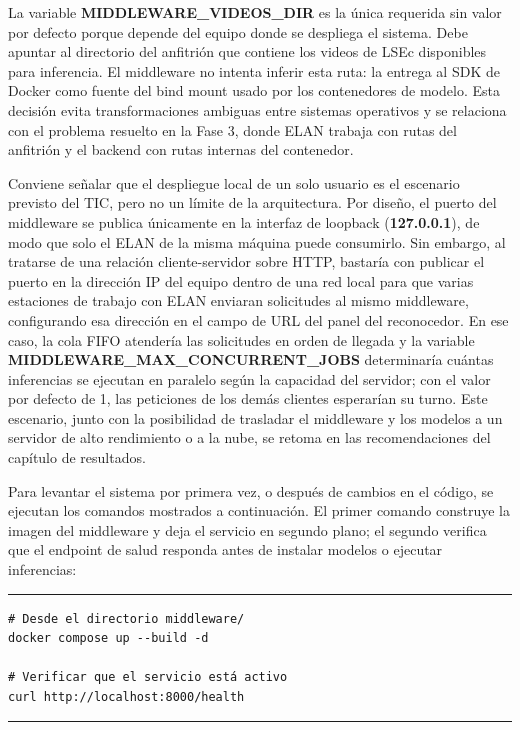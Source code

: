 La variable \textbf{MIDDLEWARE\_VIDEOS\_DIR} es la única requerida sin valor por defecto porque depende del equipo donde se despliega el sistema. Debe apuntar al directorio del anfitrión que contiene los videos de LSEc disponibles para inferencia. El middleware no intenta inferir esta ruta: la entrega al SDK de Docker como fuente del bind mount usado por los contenedores de modelo. Esta decisión evita transformaciones ambiguas entre sistemas operativos y se relaciona con el problema resuelto en la Fase 3, donde ELAN trabaja con rutas del anfitrión y el backend con rutas internas del contenedor.

Conviene señalar que el despliegue local de un solo usuario es el escenario previsto del TIC, pero no un límite de la arquitectura. Por diseño, el puerto del middleware se publica únicamente en la interfaz de loopback (\textbf{127.0.0.1}), de modo que solo el ELAN de la misma máquina puede consumirlo. Sin embargo, al tratarse de una relación cliente-servidor sobre HTTP, bastaría con publicar el puerto en la dirección IP del equipo dentro de una red local para que varias estaciones de trabajo con ELAN enviaran solicitudes al mismo middleware, configurando esa dirección en el campo de URL del panel del reconocedor. En ese caso, la cola FIFO atendería las solicitudes en orden de llegada y la variable \textbf{MIDDLEWARE\_MAX\_CONCURRENT\_JOBS} determinaría cuántas inferencias se ejecutan en paralelo según la capacidad del servidor; con el valor por defecto de 1, las peticiones de los demás clientes esperarían su turno. Este escenario, junto con la posibilidad de trasladar el middleware y los modelos a un servidor de alto rendimiento o a la nube, se retoma en las recomendaciones del capítulo de resultados.

Para levantar el sistema por primera vez, o después de cambios en el código, se ejecutan los comandos mostrados a continuación. El primer comando construye la imagen del middleware y deja el servicio en segundo plano; el segundo verifica que el endpoint de salud responda antes de instalar modelos o ejecutar inferencias:

\begin{center}
\begin{minipage}{0.78\textwidth}
\hrule
\vspace{0.10cm}
\footnotesize
\begin{Verbatim}[baselinestretch=0.78]
# Desde el directorio middleware/
docker compose up --build -d

# Verificar que el servicio está activo
curl http://localhost:8000/health
\end{Verbatim}
\vspace{0.03cm}
\hrule

\label{lst:comandos_despliegue_middleware}
\end{minipage}
\end{center}

